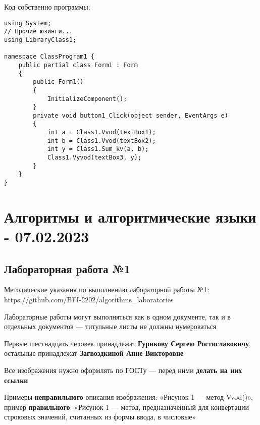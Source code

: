 \documentclass{article}
\begin{document}
Код собственно программы:

\begin{verbatim}
using System;
// Прочие юзинги...
using LibraryClass1;

namespace ClassProgram1 {
    public partial class Form1 : Form
    {
        public Form1()
        {
            InitializeComponent();
        }
        private void button1_Click(object sender, EventArgs e)
        {
            int a = Class1.Vvod(textBox1);
            int b = Class1.Vvod(textBox2);
            int y = Class1.Sum_kv(a, b);
            Class1.Vyvod(textBox3, y);
        }
    }
}
\end{verbatim}

\pagebreak
\section{Алгоритмы и алгоритмические языки - 07.02.2023}

\subsection{Лабораторная работа №1}

Методические указания по выполнению лабораторной работы №1: https://github.com/BFI-2202/algorithms\_laboratories

\hfill

Лабораторные работы могут выполняться как в одном документе, так и в отдельных документов — титульные листы не должны нумероваться

\hfill

Первые шестнадцать человек принадлежат \textbf{Гурикову Сергею Ростиславовичу}, остальные принадлежат \textbf{Загвоздкиной Анне Викторовне}

\hfill

Все изображения нужно оформлять по ГОСТу — перед ними \textbf{делать на них ссылки}

Примеры \textbf{неправильного} описания изображения: «Рисунок 1 — метод Vvod()», пример \textbf{правильного}: «Рисунок 1 — метод, предназначенный для конвертации строковых значений, считанных из формы ввода, в числовые»
\end{document}
